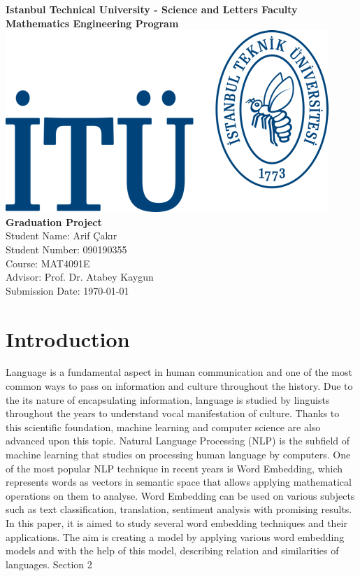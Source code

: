 \documentclass[man]{apa7}
\begin{document}
\begin{titlepage}
\centering
{\large \textbf{ Istanbul Technical University - Science and Letters Faculty}}\\
{\large \textbf{Mathematics Engineering Program}}\\[4\baselineskip]
\includegraphics[scale = 1.5]{itülogo.png}\\[6\baselineskip]
{\LARGE \textbf{Graduation Project}}\\[2\baselineskip]

{\Large Student Name: Arif Çakır}\\
{\large Student Number: 090190355}\\
{\large Course: MAT4091E}\\
{\large Advisor: Prof. Dr. Atabey Kaygun}\\
{\large Submission Date: \today}\\
\end{titlepage}
\tableofcontents
\pagebreak


\section{Introduction}
Language is a fundamental aspect in human communication and one of the most common ways to pass on information and culture throughout the history. Due to the its nature of encapsulating information, language is studied by linguists throughout the years to understand vocal manifestation of culture. Thanks to this scientific foundation, machine learning and computer science are also advanced upon this topic. Natural Language Processing (NLP) is the subfield of machine learning that studies on processing human language by computers. One of the most popular NLP technique in recent years is Word Embedding, which represents words as vectors in semantic space that allows applying mathematical operations on them to analyse. Word Embedding can be used on various subjects such as text classification, translation, sentiment analysis with promising results. 
In this paper, it is aimed to study several word embedding techniques and  their applications. The aim is creating a model by applying various word embedding models and with the help of this model, describing relation and similarities of languages. Section 2 
\end{document}
